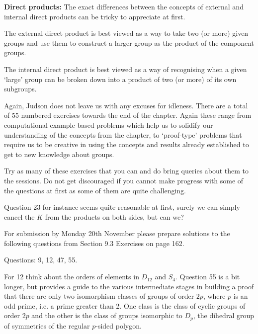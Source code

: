 \documentclass[oneside,10pt]{amsart}
\begin{document}
\textbf{Direct products:}
The exact differences between the concepts of external and internal direct products can be tricky to appreciate at first.

The external direct product is best viewed as a way to take two (or more) given groups and use them to construct a larger group as the product of the component groups.

The internal direct product is best viewed as a way of recognising when a given `large' group can be broken down into a product of two (or more) of its own subgroups.

Again, Judson does not leave us with any excuses for idleness. There are a total of 55 numbered exercises towards the end of the chapter. Again these range from computational example based problems which help us to solidify our understanding of the concepts from the chapter, to `proof-type' problems that require us to be creative in using the concepts and results already established to get to new knowledge about groups.

Try as many of these exercises that you can and do bring queries about them to the sessions. Do not get discouraged if you cannot make progress with some of the questions at first as some of them are quite challenging.

Question 23 for instance seems quite reasonable at first, surely we can simply cancel the $K$ from the products on both sides, but can we?

For submission by Monday 20th November please prepare solutions to the following questions from Section 9.3 Exercises on page 162.

Questions: 9, 12, 47, 55.

For 12 think about the orders of elements in $D_{12}$ and $S_4$. Question 55 is a bit longer, but provides a guide to the various intermediate stages in building a proof that there are only two isomorphism classes of groups of order $2p$, where $p$ is an odd prime, i.e. a prime greater than 2. One class is the class of cyclic groups of order $2p$ and the other is the class of groups isomorphic to $D_{p}$, the dihedral group of symmetries of the regular $p$-sided polygon.
\end{document}
